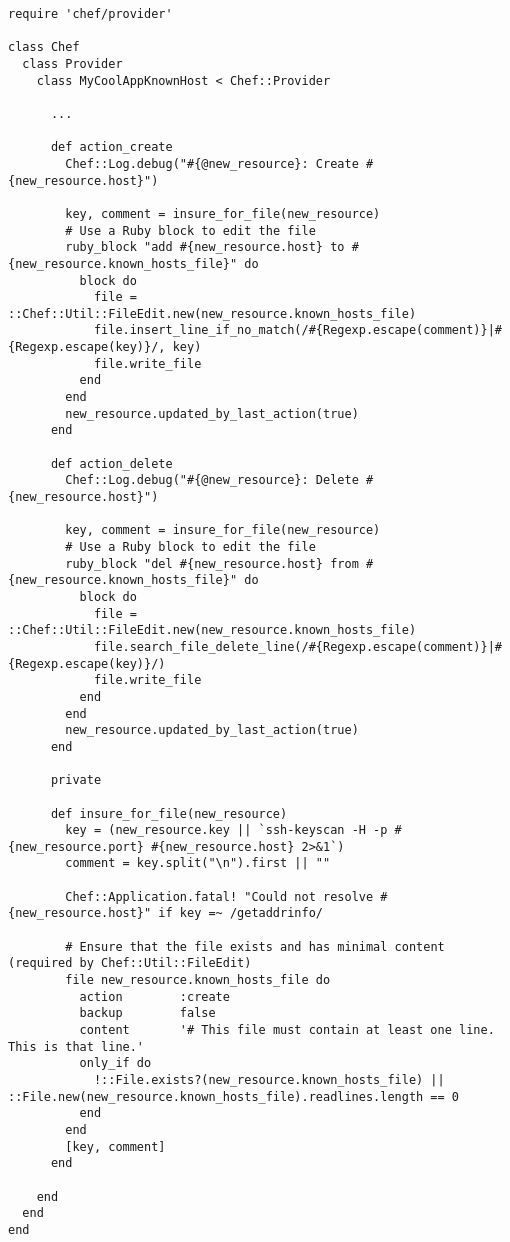 \begin{lstlisting}[label=lst:cookbook-hwrp11]
require 'chef/provider'

class Chef
  class Provider
    class MyCoolAppKnownHost < Chef::Provider

      ...

      def action_create
        Chef::Log.debug("#{@new_resource}: Create #{new_resource.host}")

        key, comment = insure_for_file(new_resource)
        # Use a Ruby block to edit the file
        ruby_block "add #{new_resource.host} to #{new_resource.known_hosts_file}" do
          block do
            file = ::Chef::Util::FileEdit.new(new_resource.known_hosts_file)
            file.insert_line_if_no_match(/#{Regexp.escape(comment)}|#{Regexp.escape(key)}/, key)
            file.write_file
          end
        end
        new_resource.updated_by_last_action(true)
      end

      def action_delete
        Chef::Log.debug("#{@new_resource}: Delete #{new_resource.host}")

        key, comment = insure_for_file(new_resource)
        # Use a Ruby block to edit the file
        ruby_block "del #{new_resource.host} from #{new_resource.known_hosts_file}" do
          block do
            file = ::Chef::Util::FileEdit.new(new_resource.known_hosts_file)
            file.search_file_delete_line(/#{Regexp.escape(comment)}|#{Regexp.escape(key)}/)
            file.write_file
          end
        end
        new_resource.updated_by_last_action(true)
      end

      private

      def insure_for_file(new_resource)
        key = (new_resource.key || `ssh-keyscan -H -p #{new_resource.port} #{new_resource.host} 2>&1`)
        comment = key.split("\n").first || ""

        Chef::Application.fatal! "Could not resolve #{new_resource.host}" if key =~ /getaddrinfo/

        # Ensure that the file exists and has minimal content (required by Chef::Util::FileEdit)
        file new_resource.known_hosts_file do
          action        :create
          backup        false
          content       '# This file must contain at least one line. This is that line.'
          only_if do
            !::File.exists?(new_resource.known_hosts_file) || ::File.new(new_resource.known_hosts_file).readlines.length == 0
          end
        end
        [key, comment]
      end

    end
  end
end
\end{lstlisting}

